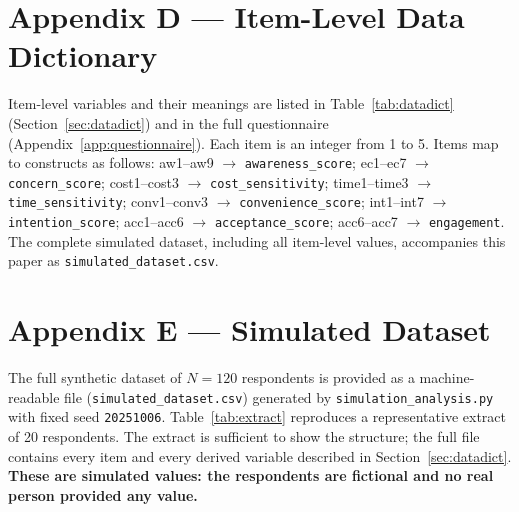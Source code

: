 \documentclass[11pt,a4paper]{article}
\newcommand{\code}[1]{\texttt{#1}}
\begin{document}
\section{Appendix D --- Item-Level Data Dictionary}
\label{app:datadict}

Item-level variables and their meanings are listed in Table~\ref{tab:datadict}
(Section~\ref{sec:datadict}) and in the full questionnaire (Appendix~\ref{app:questionnaire}). Each
item is an integer from 1 to 5. Items map to constructs as follows: aw1--aw9 $\rightarrow$
\code{awareness\_score}; ec1--ec7 $\rightarrow$ \code{concern\_score}; cost1--cost3 $\rightarrow$
\code{cost\_sensitivity}; time1--time3 $\rightarrow$ \code{time\_sensitivity}; conv1--conv3
$\rightarrow$ \code{convenience\_score}; int1--int7 $\rightarrow$ \code{intention\_score}; acc1--acc6
$\rightarrow$ \code{acceptance\_score}; acc6--acc7 $\rightarrow$ \code{engagement}. The complete
simulated dataset, including all item-level values, accompanies this paper as
\code{simulated\_dataset.csv}.

\section{Appendix E --- Simulated Dataset}
\label{app:dataset}

The full synthetic dataset of $N = 120$ respondents is provided as a machine-readable file
(\code{simulated\_dataset.csv}) generated by \code{simulation\_analysis.py} with fixed seed
\code{20251006}. Table~\ref{tab:extract} reproduces a representative extract of 20 respondents. The
extract is sufficient to show the structure; the full file contains every item and every derived
variable described in Section~\ref{sec:datadict}. \textbf{These are simulated values: the respondents
are fictional and no real person provided any value.}
\end{document}
